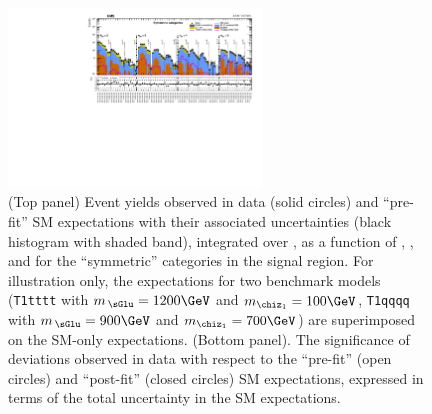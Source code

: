 \begin{figure}[!h]
  \begin{center}
    \includegraphics[angle=90,width=0.6\textwidth]{figures/result/v1/summaryPlot_Symmetric_prefit_overlay_fit_b}
    \caption{(Top panel) Event yields observed in data (solid circles)
      and ``pre-fit'' SM expectations with their associated
      uncertainties (black histogram with shaded band), integrated
      over \HTmiss, as a function of \njet, \nb, and \scalht for the
      ``symmetric'' \njet categories in the signal region. For
      illustration only, the expectations for two benchmark models
      (\texttt{T1tttt} with $m_{\,\sGlu} = 1200\GeV$ and $m_{\chiz_1}
      = 100\GeV$, \texttt{T1qqqq} with $m_{\,\sGlu} = 900\GeV$ and
      $m_{\chiz_1} = 700\GeV$) are superimposed on the SM-only
      expectations. (Bottom panel). The significance of deviations
      observed in data with respect to the ``pre-fit'' (open circles)
      and ``post-fit'' (closed circles) SM expectations, expressed in
      terms of the total uncertainty in the SM expectations. }
    \label{fig:sym}
  \end{center}
\end{figure}

